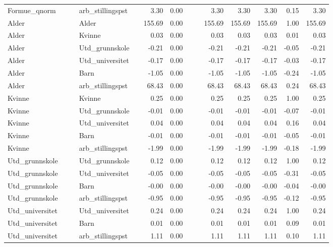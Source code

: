 \documentclass[
  12pt,
  a4paper,
  DIV=11,
  numbers=noendperiod]{scrartcl}
\begin{document}
\begin{table}[ht]
\begin{tabular}{llllrrrrrrrrr}
  Formue\_qnorm & ~~ & arb\_stillingspst &  & 3.30 & 0.00 &  &  & 3.30 & 3.30 & 3.30 & 0.15 & 3.30 \\ 
  Alder & ~~ & Alder &  & 155.69 & 0.00 &  &  & 155.69 & 155.69 & 155.69 & 1.00 & 155.69 \\ 
  Alder & ~~ & Kvinne &  & 0.03 & 0.00 &  &  & 0.03 & 0.03 & 0.03 & 0.01 & 0.03 \\ 
  Alder & ~~ & Utd\_grunnskole &  & -0.21 & 0.00 &  &  & -0.21 & -0.21 & -0.21 & -0.05 & -0.21 \\ 
  Alder & ~~ & Utd\_universitet &  & -0.17 & 0.00 &  &  & -0.17 & -0.17 & -0.17 & -0.03 & -0.17 \\ 
  Alder & ~~ & Barn &  & -1.05 & 0.00 &  &  & -1.05 & -1.05 & -1.05 & -0.24 & -1.05 \\ 
  Alder & ~~ & arb\_stillingspst &  & 68.43 & 0.00 &  &  & 68.43 & 68.43 & 68.43 & 0.24 & 68.43 \\ 
  Kvinne & ~~ & Kvinne &  & 0.25 & 0.00 &  &  & 0.25 & 0.25 & 0.25 & 1.00 & 0.25 \\ 
  Kvinne & ~~ & Utd\_grunnskole &  & -0.01 & 0.00 &  &  & -0.01 & -0.01 & -0.01 & -0.07 & -0.01 \\ 
  Kvinne & ~~ & Utd\_universitet &  & 0.04 & 0.00 &  &  & 0.04 & 0.04 & 0.04 & 0.16 & 0.04 \\ 
  Kvinne & ~~ & Barn &  & -0.01 & 0.00 &  &  & -0.01 & -0.01 & -0.01 & -0.05 & -0.01 \\ 
  Kvinne & ~~ & arb\_stillingspst &  & -1.99 & 0.00 &  &  & -1.99 & -1.99 & -1.99 & -0.18 & -1.99 \\ 
  Utd\_grunnskole & ~~ & Utd\_grunnskole &  & 0.12 & 0.00 &  &  & 0.12 & 0.12 & 0.12 & 1.00 & 0.12 \\ 
  Utd\_grunnskole & ~~ & Utd\_universitet &  & -0.05 & 0.00 &  &  & -0.05 & -0.05 & -0.05 & -0.31 & -0.05 \\ 
  Utd\_grunnskole & ~~ & Barn &  & -0.00 & 0.00 &  &  & -0.00 & -0.00 & -0.00 & -0.04 & -0.00 \\ 
  Utd\_grunnskole & ~~ & arb\_stillingspst &  & -0.95 & 0.00 &  &  & -0.95 & -0.95 & -0.95 & -0.12 & -0.95 \\ 
  Utd\_universitet & ~~ & Utd\_universitet &  & 0.24 & 0.00 &  &  & 0.24 & 0.24 & 0.24 & 1.00 & 0.24 \\ 
  Utd\_universitet & ~~ & Barn &  & 0.01 & 0.00 &  &  & 0.01 & 0.01 & 0.01 & 0.09 & 0.01 \\ 
  Utd\_universitet & ~~ & arb\_stillingspst &  & 1.11 & 0.00 &  &  & 1.11 & 1.11 & 1.11 & 0.10 & 1.11 \\ 

\end{tabular}
\end{table}
\end{document}
